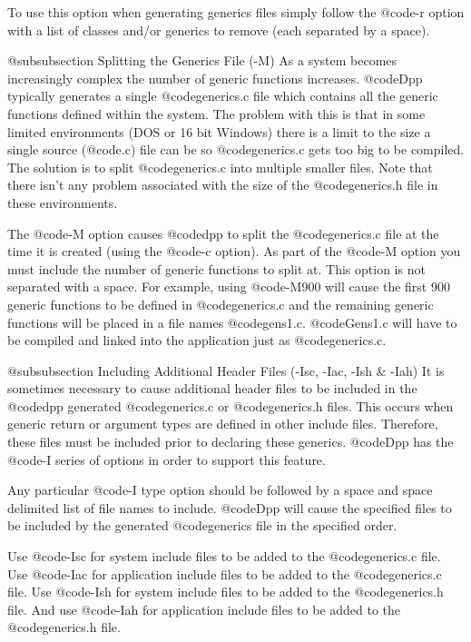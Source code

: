 To use this option when generating generics files simply follow the
@code{-r} option with a list of classes and/or generics to remove (each
separated by a space).

@subsubsection Splitting the Generics File (-M)
As a system becomes increasingly complex the number of generic functions
increases.  @code{Dpp} typically generates a single @code{generics.c}
file which contains all the generic functions defined within the system.
The problem with this is that in some limited environments (DOS or 16
bit Windows) there is a limit to the size a single source (@code{.c})
file can be so @code{generics.c} gets too big to be compiled.  The
solution is to split @code{generics.c} into multiple smaller files. Note
that there isn't any problem associated with the size of the
@code{generics.h} file in these environments.

The @code{-M} option causes @code{dpp} to split the @code{generics.c}
file at the time it is created (using the @code{-c} option).  As part
of the @code{-M} option you must include the number of generic functions
to split at.  This option is not separated with a space.  For example,
using @code{-M900} will cause the first 900 generic functions to be
defined in @code{generics.c} and the remaining generic functions will
be placed in a file names @code{gens1.c}.  @code{Gens1.c} will have to
be compiled and linked into the application just as @code{generics.c}.

@subsubsection Including Additional Header Files (-Isc, -Iac, -Ish & -Iah)
It is sometimes necessary to cause additional header files to be
included in the @code{dpp} generated @code{generics.c} or
@code{generics.h} files.  This occurs when generic return or argument
types are defined in other include files.  Therefore, these files must
be included prior to declaring these generics.  @code{Dpp} has the
@code{-I} series of options in order to support this feature.

Any particular @code{-I} type option should be followed by a space and
space delimited list of file names to include.  @code{Dpp} will cause
the specified files to be included by the generated @code{generics}
file in the specified order.

Use @code{-Isc} for system include files to be added to the
@code{generics.c} file.  Use @code{-Iac} for application include files
to be added to the @code{generics.c} file.  Use @code{-Ish} for system
include files to be added to the @code{generics.h} file. And use
@code{-Iah} for application include files to be added to the
@code{generics.h} file.

